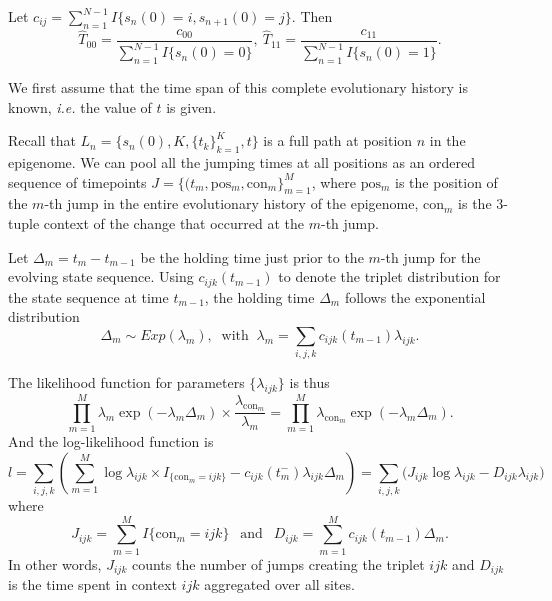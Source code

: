 \documentclass[11pt]{article}
\newcommand{\context}{\ensuremath{\mathrm{con}}}
\newcommand{\psn}{\ensuremath{\mathrm{pos}}}
\begin{document}
Let $c_{ij} = \sum_{n=1}^{N-1}I\{s_n(0) =i, s_{n+1}(0)=j\}$. Then
\[
\hat{T}_{00} = \frac{c_{00}}{\sum_{n=1}^{N-1}I\{s_n(0) = 0\}}, ~
\hat{T}_{11} = \frac{c_{11}}{\sum_{n=1}^{N-1}I\{s_n(0) = 1\}}.
\]

We first assume that the time span of this complete evolutionary
history is known, \textit{i.e.} the value of $t$ is given.

Recall that $L_n = \{s_n(0), K, \{t_k\}_{k=1}^K, t\}$ is a full path
at position $n$ in the epigenome. We can pool all the jumping times at
all positions as an ordered sequence of timepoints $J = \{(t_m,
\psn{}_m, \context{}_m\}_{m=1}^{M}$, where $\psn{}_m$ is the position
of the $m$-th jump in the entire evolutionary history of the
epigenome, $\context{}_m$ is the 3-tuple context of the change that
occurred at the $m$-th jump.

Let $\Delta_m = t_{m} - t_{m-1}$ be the holding time just prior to the
$m$-th jump for the evolving state sequence. Using $c_{ijk}(t_{m-1})$ to
denote the triplet distribution for the state sequence at time
$t_{m-1}$, the holding time $\Delta_m$ follows the exponential
distribution
\[
\Delta_m \sim \mathit{Exp}(\lambda_m), ~\text{ with }~
\lambda_{m} = \sum_{i,j,k}c_{ijk}(t_{m-1})\lambda_{ijk}.
\]

The likelihood function for parameters $\{\lambda_{ijk}\}$ is thus
\begin{equation}\label{eqn:lik}
  \prod_{m=1}^{M} \lambda_{m} \exp(-\lambda_{m}\Delta_m) \times \frac{\lambda_{\context{}_m}}{\lambda_m}
  =\prod_{m=1}^{M}\lambda_{\context{}_m}\exp(-\lambda_m\Delta_m).
\end{equation}
And the log-likelihood function is
\begin{equation}\label{eqn:loglik1}
    l = \sum_{i,j,k} \left(\sum_{m=1}^M\log\lambda_{ijk}\times I_{\{\context{}_m = ijk\}} - c_{ijk}(t_m^-)\lambda_{ijk}\Delta_m\right)
     = \sum_{i,j,k} \big(J_{ijk}\log\lambda_{ijk} - D_{ijk}\lambda_{ijk} \big)
\end{equation}
where
\[
J_{ijk} = \sum_{m=1}^M I\{\context{}_m = ijk\}
~~\mbox{ and }~~
D_{ijk} = \sum_{m=1}^Mc_{ijk}(t_{m-1})\Delta_m.
\]
In other words, $J_{ijk}$ counts the number of jumps creating the
triplet $ijk$ and $D_{ijk}$ is the time spent in context $ijk$
aggregated over all sites.

\end{document}
